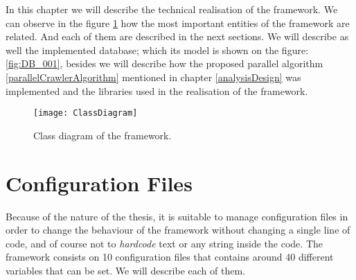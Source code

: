 In this chapter we will describe the technical realisation of the framework. We can observe in the figure \ref{fig:ClassDiagram} how the most important entities of the framework are related. And each of them are described in the next sections. We will describe as well the implemented database; which its model is shown on the figure: \ref{fig:DB_001}, besides we will describe how the proposed parallel algorithm \ref{parallelCrawlerAlgorithm} mentioned in chapter \ref{analysisDesign} was implemented  and the libraries used in the realisation of the framework.

	\begin{figure}\centering
		\texttt{[image: ClassDiagram]}
		\caption{Class diagram of the framework.}\label{fig:ClassDiagram}
	\end{figure}

\section{Configuration Files}

Because of the nature of the thesis, it is suitable to manage configuration files in order to change the behaviour of the framework without changing a single line of code, and of course not to \emph{hardcode} text or any string inside the code. The framework consists on 10 configuration files that contains around 40 different variables that can be set. We will describe each of them.


